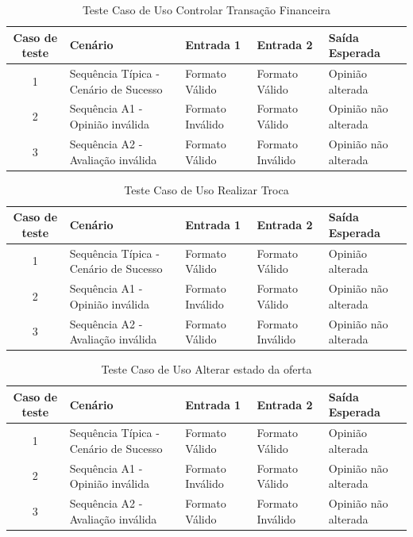 \documentclass[a4paper,11pt]{article}
\begin{document}
	\begin{center}
	\begin{table}[H]
		\begin{tabularx}{\textwidth}{c|X|X|X|X}
			\textbf{Caso de teste} & \textbf{Cenário} & \textbf{Entrada 1} & \textbf{Entrada 2} & \textbf{Saída Esperada} \\
			\hline
			1 & Sequência Típica - Cenário de Sucesso & Formato Válido & Formato Válido & Opinião alterada\\ \hline
			2 & Sequência A1 - Opinião inválida & Formato Inválido & Formato Válido & Opinião não alterada\\ \hline
			3 & Sequência A2 - Avaliação inválida & Formato Válido & Formato Inválido & Opinião não alterada\\ \hline
			
		\end{tabularx}
		\caption{Teste Caso de Uso Controlar Transação Financeira}
	\end{table}
	\end{center}
	
	\begin{center}
	\begin{table}[H]
		\begin{tabularx}{\textwidth}{c|X|X|X|X}
			\textbf{Caso de teste} & \textbf{Cenário} & \textbf{Entrada 1} & \textbf{Entrada 2} & \textbf{Saída Esperada} \\
			\hline
			1 & Sequência Típica - Cenário de Sucesso & Formato Válido & Formato Válido & Opinião alterada\\ \hline
			2 & Sequência A1 - Opinião inválida & Formato Inválido & Formato Válido & Opinião não alterada\\ \hline
			3 & Sequência A2 - Avaliação inválida & Formato Válido & Formato Inválido & Opinião não alterada\\ \hline
			
		\end{tabularx}
		\caption{Teste Caso de Uso Realizar Troca}
	\end{table}
	\end{center}
	
	\begin{center}
	\begin{table}[H]
		\begin{tabularx}{\textwidth}{c|X|X|X|X}
			\textbf{Caso de teste} & \textbf{Cenário} & \textbf{Entrada 1} & \textbf{Entrada 2} & \textbf{Saída Esperada} \\
			\hline
			1 & Sequência Típica - Cenário de Sucesso & Formato Válido & Formato Válido & Opinião alterada\\ \hline
			2 & Sequência A1 - Opinião inválida & Formato Inválido & Formato Válido & Opinião não alterada\\ \hline
			3 & Sequência A2 - Avaliação inválida & Formato Válido & Formato Inválido & Opinião não alterada\\ \hline
			
		\end{tabularx}
		\caption{Teste Caso de Uso Alterar estado da oferta}
	\end{table}
	\end{center}
	
\end{document}

